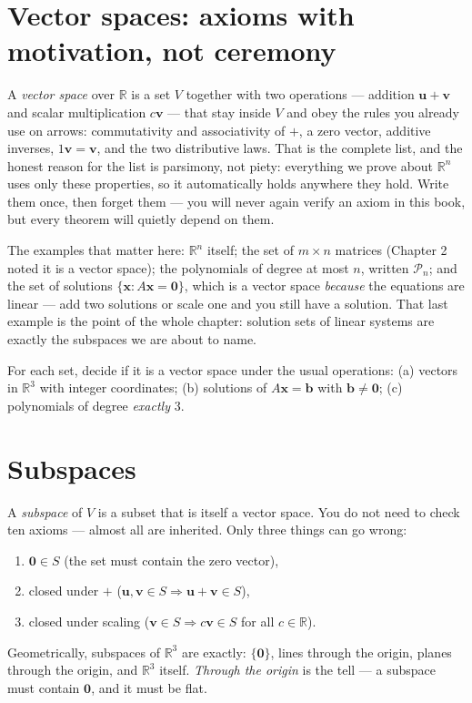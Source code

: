 \section{Vector spaces: axioms with motivation, not ceremony}\label{sec:axioms}

A \emph{vector space} over $\mathbb{R}$ is a set $V$ together with two operations — addition $\mathbf{u}+\mathbf{v}$ and scalar multiplication $c\mathbf{v}$ — that stay inside $V$ and obey the rules you already use on arrows: commutativity and associativity of $+$, a zero vector, additive inverses, $1\mathbf{v}=\mathbf{v}$, and the two distributive laws. That is the complete list, and the honest reason for the list is parsimony, not piety: everything we prove about $\mathbb{R}^n$ uses only these properties, so it automatically holds anywhere they hold. Write them once, then forget them — you will never again verify an axiom in this book, but every theorem will quietly depend on them.

The examples that matter here: $\mathbb{R}^n$ itself; the set of $m\times n$ matrices (Chapter 2 noted it is a vector space); the polynomials of degree at most $n$, written $\mathcal{P}_n$; and the set of solutions $\{\mathbf{x}:A\mathbf{x}=\mathbf{0}\}$, which is a vector space \emph{because} the equations are linear — add two solutions or scale one and you still have a solution. That last example is the point of the whole chapter: solution sets of linear systems are exactly the subspaces we are about to name.

\begin{exercise}[easy]
For each set, decide if it is a vector space under the usual operations: (a) vectors in $\mathbb{R}^3$ with integer coordinates; (b) solutions of $A\mathbf{x}=\mathbf{b}$ with $\mathbf{b}\neq\mathbf{0}$; (c) polynomials of degree \emph{exactly} $3$.
\end{exercise}

\section{Subspaces}\label{sec:subspaces}

A \emph{subspace} of $V$ is a subset that is itself a vector space. You do not need to check ten axioms — almost all are inherited. Only three things can go wrong:
\begin{enumerate}
  \item $\mathbf{0}\in S$ \;(the set must contain the zero vector),
  \item closed under $+$ \;($\mathbf{u},\mathbf{v}\in S \Rightarrow \mathbf{u}+\mathbf{v}\in S$),
  \item closed under scaling \;($\mathbf{v}\in S \Rightarrow c\mathbf{v}\in S$ for all $c\in\mathbb{R}$).
\end{enumerate}
Geometrically, subspaces of $\mathbb{R}^3$ are exactly: $\{\mathbf{0}\}$, lines through the origin, planes through the origin, and $\mathbb{R}^3$ itself. \emph{Through the origin} is the tell — a subspace must contain $\mathbf{0}$, and it must be flat.

